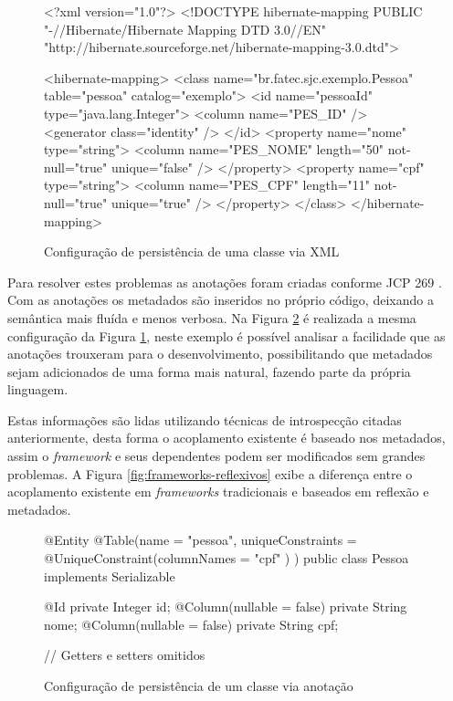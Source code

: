 \begin{figure}[H]
    \centering
    \caption{Configuração de persistência de uma classe via XML}
    \begin{xml}
<?xml version="1.0"?>
<!DOCTYPE hibernate-mapping PUBLIC "-//Hibernate/Hibernate Mapping DTD 3.0//EN"
"http://hibernate.sourceforge.net/hibernate-mapping-3.0.dtd">

<hibernate-mapping>
    <class name="br.fatec.sjc.exemplo.Pessoa" table="pessoa" catalog="exemplo">
        <id name="pessoaId" type="java.lang.Integer">
            <column name="PES_ID" />
            <generator class="identity" />
        </id>
        <property name="nome" type="string">
            <column name="PES_NOME" length="50" not-null="true" unique="false" />
        </property>
        <property name="cpf" type="string">
            <column name="PES_CPF" length="11" not-null="true" unique="true" />
        </property>
    </class>
</hibernate-mapping>
    \end{xml}
    \label{fig:arquivo-metadado}
\end{figure}

\par Para resolver estes problemas as anotações foram criadas conforme JCP 269 \cite{jcp2005annotation269}. Com as anotações os metadados são inseridos no próprio código, deixando a semântica mais fluída e menos verbosa. Na Figura \ref{fig:classe-metadado} é realizada a mesma configuração da Figura \ref{fig:arquivo-metadado}, neste exemplo é possível analisar a facilidade que as anotações trouxeram para o desenvolvimento, possibilitando que metadados sejam adicionados de uma forma mais natural, fazendo parte da própria linguagem.

\par Estas informações são lidas utilizando técnicas de introspecção citadas anteriormente, desta forma o acoplamento existente é baseado nos metadados, assim o \textit{framework} e seus dependentes podem ser modificados sem grandes problemas. A Figura \ref{fig:frameworks-reflexivos} exibe a diferença entre o acoplamento existente em \textit{frameworks} tradicionais e baseados em reflexão e metadados.

\begin{figure}[H]
    \centering
    \caption{Configuração de persistência de um classe via anotação}
    \begin{java}
@Entity
@Table(name = "pessoa", uniqueConstraints = { @UniqueConstraint(columnNames = { "cpf" }) 
})
public class Pessoa implements Serializable {

	@Id
	private Integer id;
	@Column(nullable = false)
	private String nome;
	@Column(nullable = false)
	private String cpf;

    // Getters e setters omitidos

}
    \end{java}
    \label{fig:classe-metadado}
\end{figure}

